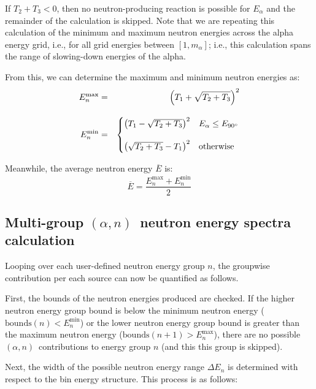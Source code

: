 \documentclass[10pt]{article}
\newcommand{\alphn}[0]{$\left(\alpha,n\right)$}
\begin{document}
If $T_2 + T_3 < 0$, then no neutron-producing reaction is possible for $E_\alpha$ and the remainder of the calculation is skipped. Note that we are repeating this calculation of the minimum and maximum neutron energies across the alpha energy grid, i.e., for all grid energies between $\left[1,m_\alpha \right]$; i.e., this calculation spans the range of slowing-down energies of the alpha.

From this, we can determine the maximum and minimum neutron energies as:
\begin{eqnarray}
E_n^{\max} & = &  \left( T_1 + \sqrt{T_2 + T_3} \right)^2 \\[10pt]
E_n^{\min} & = & 
\begin{cases}
\left(T_1 - \sqrt{T_2 + T_3}\right)^2 & E_\alpha \leq E_{90\degree} \\[12pt]
\left(\sqrt{T_2 + T_3}-T_1\right)^2 & \mathrm{otherwise}
\end{cases}
\end{eqnarray}

Meanwhile, the average neutron energy $\overline{E}$ is:
\begin{equation}
\overline{E} = \frac{E_n^{\max} + E_n^{\min}}{2}
\end{equation}


\subsection{Multi-group \alphn\ neutron energy spectra calculation}

Looping over each user-defined neutron energy group $n$, the groupwise contribution per each source can now be quantified as follows.

First, the bounds of the neutron energies produced are checked. If the higher neutron energy group bound is below the minimum neutron energy ($\mathrm{bounds}\left(n\right) < E_n^{\min}$) or the lower neutron energy group bound is greater than the maximum neutron energy ($\mathrm{bounds}\left(n+1\right) > E_n^{\max}$), there are no possible \alphn\ contributions to energy group $n$ (and this this group is skipped).

Next, the width of the possible neutron energy range $\Delta E_n$ is determined with respect to the bin energy structure. This process is as follows:
\end{document}
